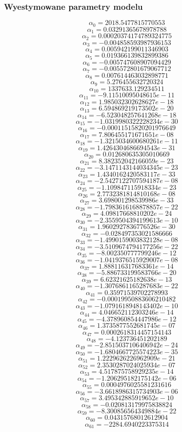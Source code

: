 \documentclass{article}
\begin{document}
\subsubsection{Wyestymowane parametry modelu}
\[\alpha_{0} = 2018.5477815770553\]
\[\alpha_{1} = 0.03291365678978788\]
\[\alpha_{2} = 0.00020374174789324775\]
\[\alpha_{3} = -0.004858593987936153\]
\[\alpha_{4} = 0.005942199011346903\]
\[\alpha_{5} = 0.019366139832899386\]
\[\alpha_{6} = -0.005747608907094429\]
\[\alpha_{7} = -0.005572801679067712\]
\[\alpha_{8} = 0.007614463032898771\]
\[\alpha_{9} = 5.276455632720324\]
\[\alpha_{10} = 1337633.129234511\]
\[\alpha_{11} = -9.11510095048615e-11\]
\[\alpha_{12} = 1.985032302628627e-18\]
\[\alpha_{13} = 6.594869219173502e-20\]
\[\alpha_{14} = -6.523048257641268e-18\]
\[\alpha_{15} = -1.0319980322228234e-30\]
\[\alpha_{16} = -0.00011515820201976649\]
\[\alpha_{17} = 7.806455171671651e-08\]
\[\alpha_{18} = -1.3215034600680261e-11\]
\[\alpha_{19} = 1.4264304686694543e-31\]
\[\alpha_{20} = 0.012680635305010669\]
\[\alpha_{21} = 8.382352042166059e-23\]
\[\alpha_{22} = -3.1471143144034345e-23\]
\[\alpha_{23} = 1.4340162420583117e-33\]
\[\alpha_{24} = -2.5427122707594187e-08\]
\[\alpha_{25} = -1.109847115918334e-23\]
\[\alpha_{26} = 2.7732381814810168e-08\]
\[\alpha_{27} = 3.698001298539986e-33\]
\[\alpha_{28} = -1.7983616168878857e-22\]
\[\alpha_{29} = 4.09817668810202e-24\]
\[\alpha_{30} = -2.3559504394199613e-10\]
\[\alpha_{31} = 1.9602927836776526e-30\]
\[\alpha_{32} = -0.028497353021586666\]
\[\alpha_{33} = -1.4990159003832128e-08\]
\[\alpha_{34} = -3.5109674794177256e-22\]
\[\alpha_{35} = -8.002350777799246e-12\]
\[\alpha_{36} = -1.0419376515929007e-08\]
\[\alpha_{37} = 1.888116317683361e-14\]
\[\alpha_{38} = -5.886733199583766e-20\]
\[\alpha_{39} = 6.62321625182638e-13\]
\[\alpha_{40} = -1.3076861165287683e-22\]
\[\alpha_{41} = 0.35971539702278993\]
\[\alpha_{42} = -0.00019950883606210482\]
\[\alpha_{43} = -1.0791618948143402e-10\]
\[\alpha_{44} = 4.046652112303246e-14\]
\[\alpha_{45} = -4.378960854447986e-12\]
\[\alpha_{46} = 1.3735877552681745e-07\]
\[\alpha_{47} = 0.0002618314457154143\]
\[\alpha_{48} = -4.123736451202189\]
\[\alpha_{49} = -2.8515037106406942e-24\]
\[\alpha_{50} = -1.6804667725574223e-35\]
\[\alpha_{51} = 1.2229626226962909e-21\]
\[\alpha_{52} = 2.3530287024025934e-07\]
\[\alpha_{53} = 4.517875758929235e-14\]
\[\alpha_{54} = -1.206295182175142e-06\]
\[\alpha_{55} = 0.0004976025581231616\]
\[\alpha_{56} = -3.6618986315734903e-06\]
\[\alpha_{57} = 3.495342885919652e-10\]
\[\alpha_{58} = -0.020813179975838824\]
\[\alpha_{59} = -8.300856564349884e-22\]
\[\alpha_{60} = 0.04315768012612904\]
\[\alpha_{61} = -2284.6940223375314\]
\end{document}
